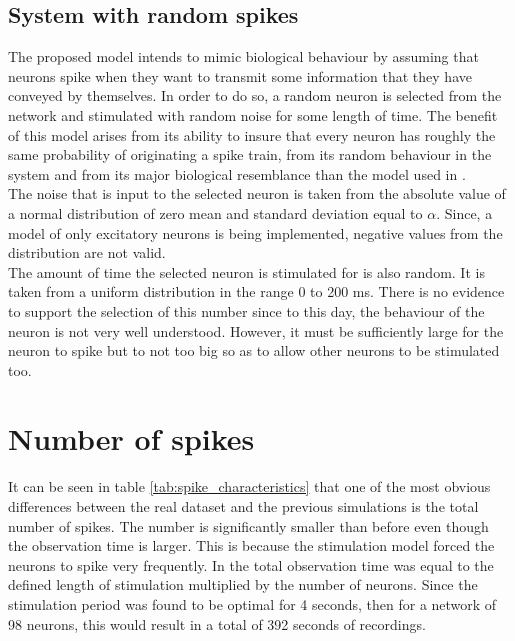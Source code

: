 \subsection{System with random spikes}\label{sec:sys_rand_spikes}

The proposed model intends to mimic biological behaviour by assuming that neurons spike when they want to transmit some information that they have conveyed by themselves. In order to do so, a random neuron is selected from the network and stimulated with random noise for some length of time.
The benefit of this model arises from its ability to insure that every neuron has roughly the same probability of originating a spike train, from its random behaviour in the system and from its major biological resemblance than the model used in \cite{alexandru2018estimating}.\\

The noise that is input to the selected neuron is taken from the absolute value of a normal distribution of zero mean and standard deviation equal to \(\alpha\). Since, a model of only excitatory neurons is being implemented, negative values from the distribution are not valid. \\

The amount of time the selected neuron is stimulated for is also random. It is taken from a uniform distribution in the range 0 to 200 ms. There is no evidence to support the selection of this number since to this day, the behaviour of the neuron is not very well understood. However, it must be sufficiently large for the neuron to spike but to not too big so as to allow other neurons to be stimulated too. \\



\section{Number of spikes}\label{sec:number_of_spikes}

It can be seen in table \ref{tab:spike_characteristics} that one of the most obvious differences between the real dataset and the previous simulations is the total number of spikes. The number is significantly smaller than before even though the observation time is larger. This is because the stimulation model forced the neurons to spike very frequently. In \cite{alexandru2018estimating} the total observation time was equal to the defined length of stimulation multiplied by the number of neurons. Since the stimulation period was found to be optimal for 4 seconds, then for a network of 98 neurons, this would result in a total of 392 seconds of recordings. \\ 


